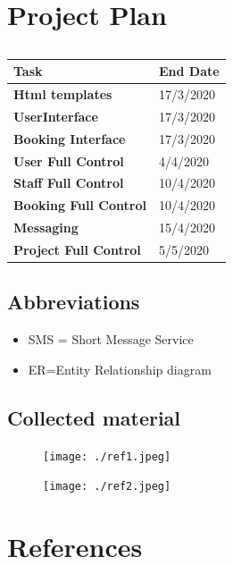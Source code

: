 \documentclass[]{article}
\begin{document}
\section{Project Plan}
\FloatBarrier
\begin{table}[h]
\caption{}
\label{tab:my-table}
\begin{tabular}{|p{}|p{}|}
\hline
\textbf{Task} & \textbf{End Date}
\\ \hline
\textbf{Html templates}  & 17/3/2020            

\\ \hline
\textbf{UserInterface }  &  17/3/2020                          
\\ \hline
\textbf{Booking Interface}  & 17/3/2020
\\ \hline
\textbf{User Full Control}  &  4/4/2020  
\\ \hline
\textbf{Staff Full Control}  &  10/4/2020  

\\ \hline
\textbf{Booking Full Control} & 10/4/2020

\\ \hline
\textbf{Messaging}   & 15/4/2020

\\ \hline
\textbf{Project Full Control} & 5/5/2020

\\ \hline
\end{tabular}
\end{table}


\subsection{ Abbreviations}
\begin{itemize}

\item SMS = Short Message Service
\item ER=Entity Relationship diagram

\end{itemize}

\subsection{Collected material}
\begin{figure}[h]
\centering
\texttt{[image: ./ref1.jpeg]}
\label{label1}
\end{figure}
\begin{figure}[h]
\centering
\texttt{[image: ./ref2.jpeg]}

\label{label2}
\end{figure}
\FloatBarrier

\section {References}




\end{document}
